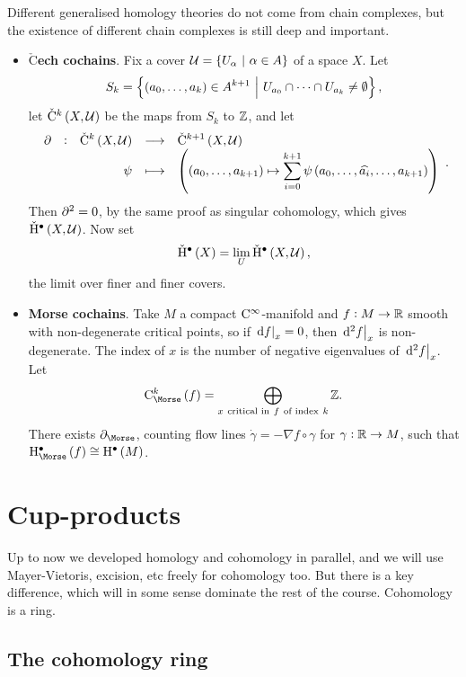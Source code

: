 \begin{remark*}
Different generalised homology theories do not come from chain complexes, but the existence of different chain complexes is still deep and important.
\begin{itemize}
\item \textbf{$\check{\text{C}}$ech cochains}. Fix a cover $ \UUU = \cbr{U_\alpha \st \alpha \in A} $ of a space $ X $. Let
$$ S_k = \cbr{\br{a_0, \dots, a_k} \in A^{k + 1} \st U_{a_0} \cap \dots \cap U_{a_k} \ne \emptyset}, $$
let $ \vC^k\br{X, \UUU} $ be the maps from $ S_k $ to $ \mathbb{Z} $, and let
$$ \function[\da]{\vC^k\br{X, \UUU}}{\vC^{k + 1}\br{X, \UUU}}{\psi}{\br{\br{a_0, \dots, a_{k + 1}} \mapsto \sum_{i = 0}^{k + 1} \psi\br{a_0, \dots, \widehat{a_i}, \dots, a_{k + 1}}}}. $$
Then $ \partial^2 = 0 $, by the same proof as singular cohomology, which gives $ \vH^\bullet\br{X, \UUU} $. Now set
$$ \vH^\bullet\br{X} = \lim_U \vH^\bullet\br{X, \UUU}, $$
the limit over finer and finer covers.
\item \textbf{Morse cochains}. Take $ M $ a compact $ \mathrm{C}^\infty $-manifold and $ f : M \to \mathbb{R} $ smooth with non-degenerate critical points, so if $ \left. \mathrm{d} f \right|_x = 0 $, then $ \left. \mathrm{d}^2f \right|_x $ is non-degenerate. The index of $ x $ is the number of negative eigenvalues of $ \left. \mathrm{d}^2f \right|_x $. Let
$$ \C_{\Morse}^k\br{f} = \bigoplus_{x \ \text{critical in} \ f \ \text{of index} \ k} \ZZ. $$
There exists $ \da_{\Morse} $, counting flow lines $ \dot{\gamma} = -\nabla f \circ \gamma $ for $ \gamma : \mathbb{R} \to M $, such that $ \H_{\Morse}^\bullet\br{f} \cong \H^\bullet\br{M} $.
\end{itemize}
\end{remark*}

\pagebreak

\section{Cup-products}


Up to now we developed homology and cohomology in parallel, and we will use Mayer-Vietoris, excision, etc freely for cohomology too. But there is a key difference, which will in some sense dominate the rest of the course. Cohomology is a ring.

\subsection{The cohomology ring}

